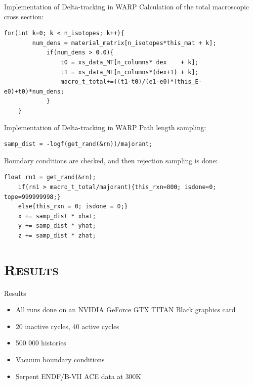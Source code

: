 \documentclass[xcolor=x11names,compress, handout]{beamer}
\renewcommand{\(}{\begin{columns}}
\renewcommand{\)}{\end{columns}}
\newcommand{\<}[1]{\begin{column}{#1}}
\renewcommand{\>}{\end{column}}
\begin{document}
\begin{frame}[fragile]{Implementation of Delta-tracking in WARP}
	\pause
	Calculation of the total macroscopic cross section:
	\vspace{5 mm}
	\pause
	\begin{Verbatim}[fontsize=\footnotesize]
	for(int k=0; k < n_isotopes; k++){
	    num_dens = material_matrix[n_isotopes*this_mat + k];
	        if(num_dens > 0.0){
	            t0 = xs_data_MT[n_columns* dex    + k];
	            t1 = xs_data_MT[n_columns*(dex+1) + k];
	            macro_t_total+=((t1-t0)/(e1-e0)*(this_E-e0)+t0)*num_dens;
	        }
	}
	\end{Verbatim}
\end{frame}


\begin{frame}[fragile]{Implementation of Delta-tracking in WARP}
	\pause
	Path length sampling:
	\vspace{2 mm}
	\pause
	\begin{Verbatim}[fontsize=\footnotesize]
	samp_dist = -logf(get_rand(&rn))/majorant;
	\end{Verbatim}
	\pause
	\vspace{2 mm}
	Boundary conditions are checked, and then rejection sampling is done:
	\pause
	\vspace{2 mm}
	\begin{Verbatim}[fontsize=\footnotesize]
	float rn1 = get_rand(&rn);
	if(rn1 > macro_t_total/majorant){this_rxn=800; isdone=0; tope=999999998;}
	else{this_rxn = 0; isdone = 0;}
	x += samp_dist * xhat;
	y += samp_dist * yhat;
	z += samp_dist * zhat;
	\end{Verbatim}
\end{frame}


\section{\scshape Results}
\begin{frame}{Results}
	\begin{itemize}
	\pause
	\item{All runs done on an NVIDIA GeForce GTX TITAN Black graphics card}
	\pause
	\item{20 inactive cycles, 40 active cycles}
	\pause
	\item{500 000 histories}
	\pause
	\item{Vacuum boundary conditions}
	\pause
	\item{Serpent ENDF/B-VII ACE data at 300K}
	\end{itemize}
\end{frame}
\end{document}
